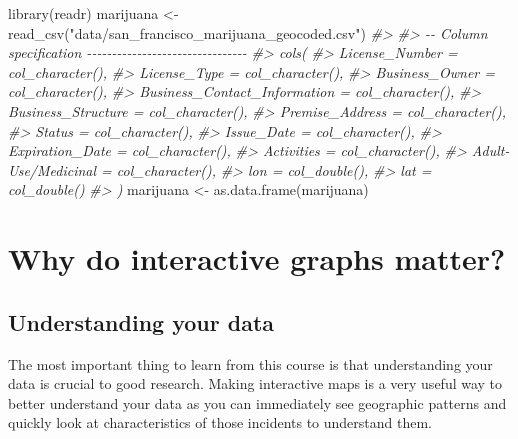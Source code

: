 \documentclass[
  12pt,
  openany]{book}
\newenvironment{Shaded}{\begin{snugshade}}{\end{snugshade}}
\newcommand{\CommentTok}[1]{\textcolor[rgb]{0.37,0.37,0.37}{\textit{#1}}}
\newcommand{\FunctionTok}[1]{\textcolor[rgb]{0,0,0}{#1}}
\newcommand{\NormalTok}[1]{#1}
\newcommand{\OtherTok}[1]{\textcolor[rgb]{0.37,0.37,0.37}{#1}}
\newcommand{\StringTok}[1]{\textcolor[rgb]{0.5,0.5,0.5}{#1}}
\begin{document}
\begin{Shaded}
\begin{Highlighting}[]
\FunctionTok{library}\NormalTok{(readr)}
\NormalTok{marijuana }\OtherTok{\textless{}{-}} \FunctionTok{read\_csv}\NormalTok{(}\StringTok{"data/san\_francisco\_marijuana\_geocoded.csv"}\NormalTok{)}
\CommentTok{\#\textgreater{} }
\CommentTok{\#\textgreater{} {-}{-} Column specification {-}{-}{-}{-}{-}{-}{-}{-}{-}{-}{-}{-}{-}{-}{-}{-}{-}{-}{-}{-}{-}{-}{-}{-}{-}{-}{-}{-}{-}{-}{-}{-}}
\CommentTok{\#\textgreater{} cols(}
\CommentTok{\#\textgreater{}   License\_Number = col\_character(),}
\CommentTok{\#\textgreater{}   License\_Type = col\_character(),}
\CommentTok{\#\textgreater{}   Business\_Owner = col\_character(),}
\CommentTok{\#\textgreater{}   Business\_Contact\_Information = col\_character(),}
\CommentTok{\#\textgreater{}   Business\_Structure = col\_character(),}
\CommentTok{\#\textgreater{}   Premise\_Address = col\_character(),}
\CommentTok{\#\textgreater{}   Status = col\_character(),}
\CommentTok{\#\textgreater{}   Issue\_Date = col\_character(),}
\CommentTok{\#\textgreater{}   Expiration\_Date = col\_character(),}
\CommentTok{\#\textgreater{}   Activities = col\_character(),}
\CommentTok{\#\textgreater{}   \textasciigrave{}Adult{-}Use/Medicinal\textasciigrave{} = col\_character(),}
\CommentTok{\#\textgreater{}   lon = col\_double(),}
\CommentTok{\#\textgreater{}   lat = col\_double()}
\CommentTok{\#\textgreater{} )}
\NormalTok{marijuana }\OtherTok{\textless{}{-}} \FunctionTok{as.data.frame}\NormalTok{(marijuana)}
\end{Highlighting}
\end{Shaded}

\hypertarget{why-do-interactive-graphs-matter}{%
\section{Why do interactive graphs matter?}\label{why-do-interactive-graphs-matter}}

\hypertarget{understanding-your-data}{%
\subsection{Understanding your data}\label{understanding-your-data}}

The most important thing to learn from this course is that understanding your data is crucial to good research. Making interactive maps is a very useful way to better understand your data as you can immediately see geographic patterns and quickly look at characteristics of those incidents to understand them.
\end{document}
